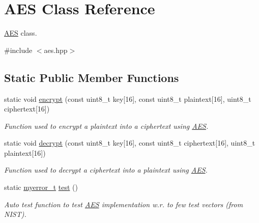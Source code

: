 \hypertarget{classAES}{}\section{A\+E\+S Class Reference}
\label{classAES}


\hyperlink{classAES}{A\+E\+S} class.  




{\ttfamily \#include $<$aes.\+hpp$>$}

\subsection*{Static Public Member Functions}
\begin{DoxyCompactItemize}
\item 
static void \hyperlink{classAES_a0e94d92922ffbae3b50378c14bdf80c3}{encrypt} (const uint8\+\_\+t key\mbox{[}16\mbox{]}, const uint8\+\_\+t plaintext\mbox{[}16\mbox{]}, uint8\+\_\+t ciphertext\mbox{[}16\mbox{]})
\begin{DoxyCompactList}\small\item\em Function used to encrypt a plaintext into a ciphertext using \hyperlink{classAES}{A\+E\+S}. \end{DoxyCompactList}\item 
static void \hyperlink{classAES_a8d6f126b784d9ab4808754fb833cdb2a}{decrypt} (const uint8\+\_\+t key\mbox{[}16\mbox{]}, const uint8\+\_\+t ciphertext\mbox{[}16\mbox{]}, uint8\+\_\+t plaintext\mbox{[}16\mbox{]})
\begin{DoxyCompactList}\small\item\em Function used to decrypt a ciphertext into a plaintext using \hyperlink{classAES}{A\+E\+S}. \end{DoxyCompactList}\item 
static \hyperlink{error_8hpp_acabd2917084445509becf54ab64a4bd0}{myerror\+\_\+t} \hyperlink{classAES_a3734b0922c9ef1364766eea2f5fd14bd}{test} ()
\begin{DoxyCompactList}\small\item\em Auto test function to test \hyperlink{classAES}{A\+E\+S} implementation w.\+r. to few test vectors (from N\+I\+S\+T). \end{DoxyCompactList}\end{DoxyCompactItemize}
